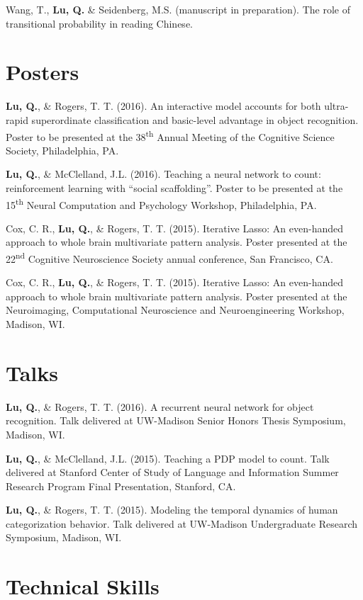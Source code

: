 \documentclass[11pt,a4paper,sans]{moderncv}        %
\newcommand{\ts}{\textsuperscript}
\begin{document}
\hangindent=0.7cm
Wang, T., \textbf{Lu, Q.} \& Seidenberg, M.S. (manuscript in preparation). The role of transitional probability in reading Chinese. 


\section{Posters}
\hangindent=0.7cm
\textbf{Lu, Q.}, \& Rogers, T. T. (2016). An interactive model accounts for both ultra-rapid superordinate classification and basic-level advantage in object recognition. Poster to be presented at the 38\ts{th} Annual Meeting of the Cognitive Science Society, Philadelphia, PA.

\hangindent=0.7cm
\textbf{Lu, Q.}, \& McClelland, J.L. (2016). Teaching a neural network to count: reinforcement learning with ``social scaffolding''. Poster to be presented at the 15\ts{th} Neural Computation and Psychology Workshop, Philadelphia, PA.

\hangindent=0.7cm
Cox, C. R., \textbf{Lu, Q.}, \& Rogers, T. T. (2015). Iterative Lasso: An even-handed approach to whole brain multivariate pattern analysis. Poster presented at the 22\ts{nd} Cognitive Neuroscience Society annual conference, San Francisco, CA.

\hangindent=0.7cm
Cox, C. R., \textbf{Lu, Q.}, \& Rogers, T. T. (2015). Iterative Lasso: An even-handed approach to whole brain multivariate pattern analysis. Poster presented at the Neuroimaging, Computational Neuroscience and Neuroengineering Workshop, Madison, WI.


\section{Talks}
\hangindent=0.7cm
\textbf{Lu, Q.}, \& Rogers, T. T. (2016). A recurrent neural network for object recognition. Talk delivered at UW-Madison Senior Honors Thesis Symposium, Madison, WI.

\hangindent=0.7cm
\textbf{Lu, Q.}, \& McClelland, J.L. (2015). Teaching a PDP model to count. Talk delivered at Stanford Center of Study of Language and Information Summer Research Program Final Presentation, Stanford, CA. 

\hangindent=0.7cm
\textbf{Lu, Q.}, \& Rogers, T. T. (2015). Modeling the temporal dynamics of human categorization behavior. Talk delivered at UW-Madison Undergraduate Research Symposium, Madison, WI.




\section{Technical Skills}
\end{document}
